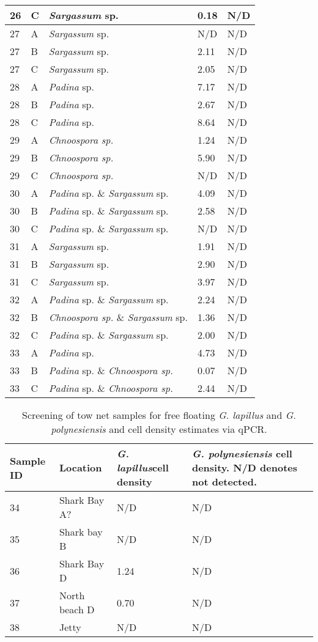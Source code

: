 \documentclass[12pt]{article}
\begin{document}
\begin{longtable}{ | p{1cm} | p{1cm} | p{3cm} | p{4cm} | p{4cm} | }
\hline
26&C&\emph{Sargassum} sp.&0.18
&N/D\\
\hline
27&A&\emph{Sargassum} sp.&N/D&N/D\\
\hline
27&B&\emph{Sargassum} sp.&2.11
&N/D\\
\hline
27&C&\emph{Sargassum} sp.&2.05
&N/D\\
\hline
28&A&\emph{Padina} sp.&7.17
&N/D\\
\hline
28&B&\emph{Padina} sp.&2.67
&N/D\\
\hline
28&C&\emph{Padina} sp.&8.64
&N/D\\
\hline
29&A&\emph{Chnoospora sp.}&1.24
&N/D\\
\hline
29&B&\emph{Chnoospora sp.}&5.90
&N/D\\
\hline
29&C&\emph{Chnoospora sp.}&N/D&N/D\\
\hline
30&A&\emph{Padina} sp. \& \emph{Sargassum} sp.&4.09
&N/D\\
\hline
30&B&\emph{Padina} sp. \& \emph{Sargassum} sp.&2.58
&N/D\\
\hline
30&C&\emph{Padina} sp. \& \emph{Sargassum} sp.&N/D&N/D\\
\hline
31&A&\emph{Sargassum} sp.&1.91
&N/D\\
\hline
31&B&\emph{Sargassum} sp.&2.90
&N/D\\
\hline
31&C&\emph{Sargassum} sp.&3.97
&N/D\\
\hline
32&A&\emph{Padina} sp. \& \emph{Sargassum} sp.&2.24
&N/D\\
\hline
32&B&\emph{Chnoospora sp.} \& \emph{Sargassum} sp.&1.36
&N/D\\
\hline
32&C&\emph{Padina} sp. \& \emph{Sargassum} sp.&2.00
&N/D\\
\hline
33&A&\emph{Padina} sp.&4.73
&N/D\\
\hline
33&B&\emph{Padina} sp. \& \emph{Chnoospora sp.}&0.07
&N/D\\
\hline
33&C&\emph{Padina} sp. \& \emph{Chnoospora sp.}&2.44
&N/D\\
\hline
\end{longtable}
\FloatBarrier
\FloatBarrier
\begin{table}
\caption{Screening of tow net samples for free floating \emph{G. lapillus} and \emph{G. polynesiensis} and cell density estimates via qPCR.}
\label{tbl:NetTable}
\begin{tabular}{ | p{4cm} | p{4cm} |p{4cm} | p{4cm} | }
\hline
\textbf{Sample ID}&\textbf{Location}&\textbf{\emph{G. lapillus}cell density}&\textbf{\emph{G. polynesiensis} cell density. N/D denotes not detected.}\\
\hline
34&Shark Bay A?&N/D&N/D\\
\hline
35&Shark bay B&N/D&N/D\\
\hline
36&Shark Bay D&1.24
&N/D\\
\hline
37&North beach D&0.70
&N/D\\
\hline
38&Jetty&N/D
&N/D\\
\hline
\end{tabular}
\end{table}
\FloatBarrier
\newpage
\end{document}
